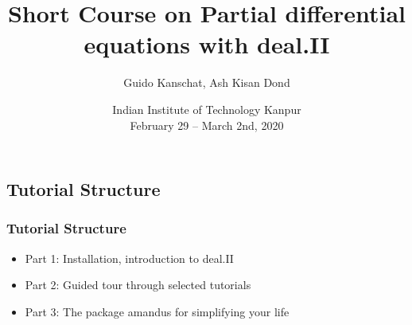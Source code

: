 \documentclass[aspectratio=43]{beamer}
\date[IITK 2020]{Indian Institute of Technology Kanpur\\
  February 29 -- March 2nd, 2020}
\title[deal.II Course]{Short Course on Partial differential equations with deal.II}
\author[Kanschat/Dond]{Guido Kanschat, Ash Kisan Dond}
\institute[IWR HD \& IISER TVM]{IWR, Universität Heidelberg
and IISER Thiruvananthapuram
  \\[2mm]
\texttt{[image: iwr]}
\hfill
\texttt{[image: dealclover]}
\hfill
\texttt{[image: unihd]}
}
\begin{document}
\begin{frame}[plain]
  \titlepage    
\end{frame}

\subsection*{Tutorial Structure}
\begin{frame}
  \frametitle{Tutorial Structure}
  \begin{itemize}
  \item Part 1: Installation, introduction to deal.II
  \item Part 2: Guided tour through selected tutorials
  \item Part 3: The package amandus for simplifying your life
  \end{itemize}
\end{frame}



%
\end{document}
